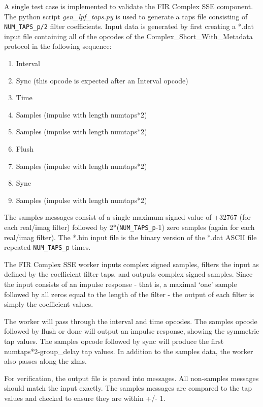 \begin{flushleft}
A single test case is implemented to validate the FIR Complex SSE component. The python script \textit{gen\_lpf\_taps.py} is used to generate a taps file consisting of \verb+NUM_TAPS_p/2+ filter coefficients. Input data is generated by first creating a *.dat input file containing all of the opcodes of the Complex\_Short\_With\_Metadata protocol in the following sequence:
\begin{enumerate}
	\item Interval
	\item Sync (this opcode is expected after an Interval opcode)
	\item Time
	\item Samples (impulse with length numtaps*2)
	\item Samples (impulse with length numtaps*2)
	\item Flush
	\item Samples (impulse with length numtaps*2)
	\item Sync
	\item Samples (impulse with length numtaps*2)
\end{enumerate}

The samples messages consist of a single maximum signed value of +32767 (for each real/imag filter) followed by 2*(\verb+NUM_TAPS_p+-1) zero samples (again for each real/imag filter). The *.bin input file is the binary version of the *.dat ASCII file repeated \verb+NUM_TAPS_p+ times.\medskip

The FIR Complex SSE worker inputs complex signed samples, filters the input as defined by the coefficient filter taps, and outputs complex signed samples. Since the input consists of an impulse response - that is, a maximal `one' sample followed by all zeros equal to the length of the filter - the output of each filter is simply the coefficient values.\medskip

The worker will pass through the interval and time opcodes. The samples opcode followed by flush or done will output an impulse response, showing the symmetric tap values. The samples opcode followed by sync will produce the first numtaps*2-group\_delay tap values. In addition to the samples data, the worker also passes along the zlms.\medskip

For verification, the output file is parsed into messages. All non-samples messages should match the input exactly. The samples messages are compared to the tap values and checked to ensure they are within +/- 1.
\end{flushleft}

